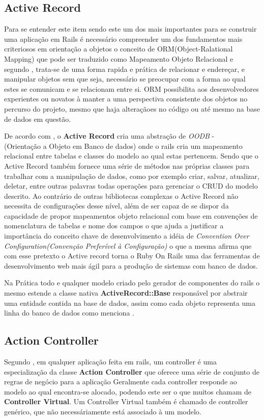 \subsection{Active Record}
Para se entender este item sendo este um dos mais importantes para se construir uma aplicação em Rails é necessário compreender um dos fundamentos mais criteriosos em orientação a objetos
o conceito de ORM(Object-Ralational Mapping) que pode ser traduzido como Mapeamento Objeto Relacional e segundo \cite{TECTARGET}, trata-se de uma forma rapida e prática de relacionar e endereçar, e manipular objetos sem que seja, necessário se preocupar com a forma ao qual estes se comunicam e se relacionam entre si.
ORM possibilita aos desenvolvedores experientes ou novatos à manter a uma perspectiva consistente dos objetos no percurso do projeto, mesmo que haja alteraçãoes no código ou até mesmo na base de dados em questão.

De acordo com \cite{BAKHARIA}, o \textbf{Active Record} cria uma abstração de \textit{OODB} - \\ (Orientação a Objeto em Banco de dados) onde o rails cria um mapeamento relacional entre tabelas e classes do modelo ao qual estas pertencem. Sendo que o Active Record também fornece uma série de métodos nas próprias classes para trabalhar com a manipulação de dados, como por exemplo criar, salvar, atualizar, deletar, entre outras palavras todas operações para gerenciar o CRUD do modelo descrito.
Ao contrário de outras bibliotecas complexas o Active Record não necessita de configurações desse nível, além de ser capaz de se dispor da capacidade de propor mapeamentos objeto relacional com base em convenções de nomenclatura de tabelas e nome dos campos o que ajuda a justificar a importância do conceito chave de desenvolvimento a idéia de \textit{ Convention Over Configuration(Convenção Preferível à Configuração) } o que a mesma afirma que com esse pretexto o Active record torna o Ruby On Rails uma das ferramentas de desenvolvimento web mais ágil para a produção de sistemas com banco de dados.

Na Prática todo e qualquer modelo criado pelo gerador de componentes do rails o mesmo estende a classe nativa \textbf{ActiveRecord::Base} responsável por abstrair uma entidade contida na base de dados, assim como cada objeto representa uma linha do banco de dados como menciona \cite{PRAGMATICRUBY}.

\subsection{Action Controller}
Segundo \cite{ORSINI}, em qualquer aplicação feita em rails, um controller é uma especialização da classe \textbf{Action Controller} que oferece uma série de conjunto de regras de negócio para a aplicação
Geralmente cada controller responde ao modelo ao qual encontra-se alocado, podendo este ser o que muitos chamam de \textbf{Controller Virtual}. Um Controller Virtual também é chamado de controller genérico, 
que não necessáriamente está associado à um modelo.

